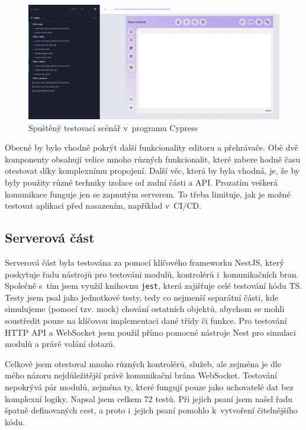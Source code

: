 \begin{figure}[ht!]
    \centering
    \includegraphics[width=1\textwidth]{media/06_testovani/e2e.png}
    \caption{Spuštěný testovací scénář v~programu Cypress}
    \label{fig:testovani/e2e}
\end{figure}


Obecně by bylo vhodné pokrýt další funkcionality editoru a přehrávače. 
Obě dvě komponenty obsahují velice mnoho různých funkcionalit, které zabere hodně času otestovat díky komplexnímu propojení.
Další věc, která by byla vhodná, je, že by byly použity různé techniky izolace od zadní části a API.
Prozatím veškerá komunikace funguje jen se zapnutým serverem.
To třeba limituje, jak je možné testovat aplikaci před nasazením, například v~CI/CD.


\subsection{Serverová část}

Serverová část byla testována za pomocí klíčového frameworku NestJS, který poskytuje řadu nástrojů pro testování modulů, kontrolérů i~komunikačních bran.
Společně s~tím jsem využil knihovnu \verb|jest|, která zajišťuje celé testování kódu TS.
Testy jsem psal jako jednotkové testy, tedy co nejmenší separátní části, kde simulujeme (pomocí tzv. mock) chování ostatních objektů, abychom se mohli soustředit pouze na klíčovou implementaci dané třídy či funkce.
Pro testování HTTP API a WebSocket jsem použil přímo pomocné nástroje Nest pro simulaci modulů a právě volání dotazů.

Celkově jsem otestoval mnoho různých kontrolérů, služeb, ale zejména je dle mého názoru nejdůležitější právě komunikační brána WebSocket.
Testování nepokrývá pár modulů, zejména ty, které fungují pouze jako uchovatelé dat bez komplexní logiky.
Napsal jsem celkem 72 testů.
Při jejich psaní jsem našel řadu špatně definovaných cest, a proto i~jejich psaní pomohlo k~vytvoření čitelnějšího kódu.

